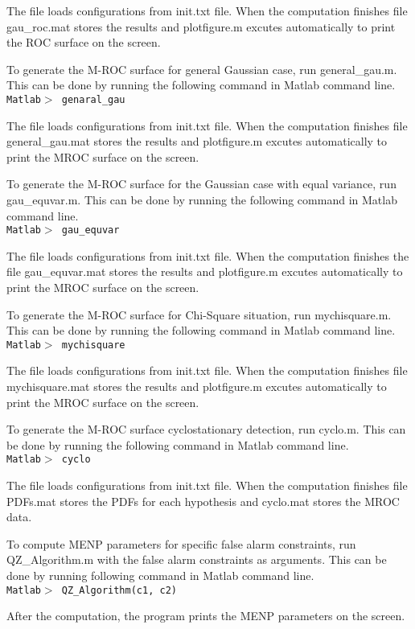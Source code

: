 The file loads configurations from init.txt file. When the computation finishes file gau\_roc.mat stores the results and plotfigure.m excutes automatically to print the ROC surface on the screen.


To generate the M-ROC surface for general Gaussian case, run general\_gau.m. This can be done by running the following command in Matlab command line.
\\\texttt{Matlab$>$ genaral\_gau}

The file loads configurations from init.txt file. When the computation finishes file general\_gau.mat stores the results and plotfigure.m excutes automatically to print the MROC surface on the screen.


To generate the M-ROC surface for the Gaussian case with equal variance, run gau\_equvar.m. This can be done by running the following command in Matlab command line.
\\\texttt{Matlab$>$ gau\_equvar}

The file loads configurations from init.txt file. When the computation finishes the file gau\_equvar.mat stores the results and plotfigure.m excutes automatically to print the MROC surface on the screen.

To generate the M-ROC surface for Chi-Square situation, run mychisquare.m. This can be done by running the following command in Matlab command line.
\\\texttt{Matlab$>$ mychisquare}

The file loads configurations from init.txt file. When the computation finishes file mychisquare.mat stores the results and plotfigure.m excutes automatically to print the MROC surface on the screen.

To generate the M-ROC surface cyclostationary detection, run cyclo.m. This can be done by running the following command in Matlab command line.
\\\texttt{Matlab$>$ cyclo}

The file loads configurations from init.txt file. When the computation finishes file PDFs.mat stores the PDFs for each hypothesis and  cyclo.mat stores the MROC data.

To compute MENP parameters for specific false alarm constraints, run QZ\_Algorithm.m with the false alarm constraints as arguments. This can be done by running following command in Matlab command line.
\\\texttt{Matlab$>$ QZ\_Algorithm(c1, c2)}

After the computation, the program prints the MENP parameters on the screen. 


